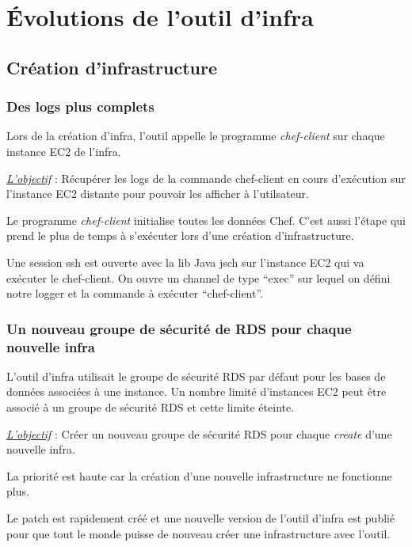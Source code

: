 \section{Évolutions de l'outil d'infra}

\subsection{Création d'infrastructure}

\subsubsection{Des logs plus complets}

Lors de la création d'infra, l'outil appelle le programme \textit{chef-client}
sur chaque instance EC2 de l'infra. 

\underline{\textit{L'objectif}} : Récupérer les logs de la commande chef-client
en cours d'exécution sur l'instance EC2 distante pour pouvoir les afficher à
l'utilsateur.

Le programme \textit{chef-client} initialise toutes les données Chef.
C'est aussi l'étape qui prend le plus de temps à s'exécuter lors d'une création
d'infrastructure.

Une session ssh est ouverte avec la lib Java jsch sur l'instance EC2 qui va
exécuter le chef-client. On ouvre un channel de type ``exec'' sur lequel on
défini notre logger et la commande à exécuter ``chef-client''.



\subsubsection{Un nouveau groupe de sécurité de RDS pour chaque nouvelle infra}

L'outil d'infra utilisait le groupe de sécurité RDS par défaut pour les bases de
données associées à une instance. Un nombre limité d'instances EC2 peut être
associé à un groupe de sécurité RDS et cette limite éteinte.

\underline{\textit{L'objectif}} : Créer un nouveau groupe de sécurité RDS pour chaque
\textit{create} d'une nouvelle infra. 

La priorité est haute car la création d'une nouvelle infrastructure ne fonctionne plus.

Le patch est rapidement créé et une nouvelle version de l'outil d'infra est
publié pour que tout le monde puisse de nouveau créer une infrastructure avec
l'outil.

